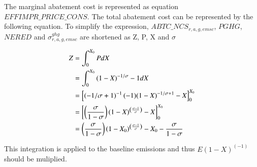 \documentclass[10pt,a4paper,titlepage,dvipdfmx]{book}
\begin{document}
The marginal abatement cost is represented as equation \(EFFIMPR\_PRICE\_CONS\). The total abatement cost can be represented by the following equation.
To simplify the expression, $ABTC\_NCS_{r,a,g,emsc}$, $PGHG$, $NERED$ and $\sigma_{r,a,g,emsc}^{ghg}$ are shortened as Z, P, X and $\sigma$

\begin{equation}
\begin{split}
Z &= \int_{0}^{X_{0}} P dX \\
&=\int_{0}^{X_{0}} {(1-X)^{-1/\sigma}-1} dX \\
&=\left\lbrack \left(-1/\sigma+1\right)^{-1}(-1)(1-X)^{-1/\sigma+1}-X\right\rbrack_{0}^{X_{0}} \\
&=\left\lbrack \left(\frac{\sigma}{1-\sigma}\right)(1-X)^{\left(\frac{\sigma-1}{\sigma}\right)}-X \right\rbrack_{0}^{X_{0}} \\
&=\left(\frac{\sigma}{1-\sigma}\right)\left(1-X_{0}\right)^{\left(\frac{\sigma-1}{\sigma}\right)}-X_{0} - \frac{\sigma}{1-\sigma} 
\end{split}
\notag\end{equation}

This integration is applied to the baseline emissions and thus $E(1-X)^{(-1)}$ should be muliplied.
\end{document}

